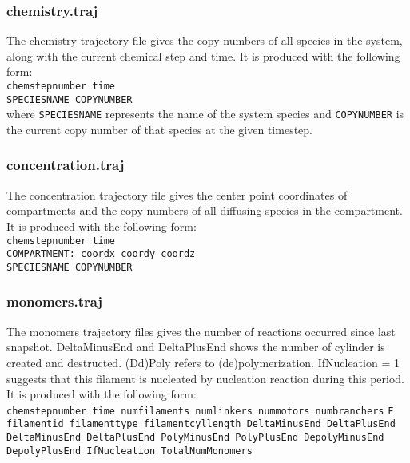 \documentclass[11pt, oneside]{article}   	%
\begin{document}
\subsubsection{chemistry.traj}
The chemistry trajectory file gives the copy numbers of all species in the system, along with the current chemical step and time. It is produced with the following form:\\

\noindent\texttt{chemstepnumber time}\\
\texttt{SPECIESNAME COPYNUMBER}\\

\noindent where \texttt{SPECIESNAME} represents the name of the system species and \texttt{COPYNUMBER} is the current copy number of that species at the given timestep.

\subsubsection{concentration.traj}
The concentration trajectory file gives the center point coordinates of compartments and the copy numbers of all diffusing species in the compartment. It is produced with the following form:\\

\noindent\texttt{chemstepnumber time}\\
\texttt{COMPARTMENT: coordx coordy coordz}\\
\texttt{SPECIESNAME COPYNUMBER}\\

\subsubsection{monomers.traj}
The monomers trajectory files gives the number of reactions occurred since last snapshot. DeltaMinusEnd and DeltaPlusEnd shows the number of cylinder is created and destructed. (Dd)Poly refers to (de)polymerization. IfNucleation = 1 suggests that this filament is nucleated by nucleation reaction during this period. It is produced with the following form:\\
\noindent\texttt{chemstepnumber time numfilaments numlinkers nummotors numbranchers}\newline
\texttt{F filamentid filamenttype filamentcyllength DeltaMinusEnd DeltaPlusEnd}\newline
\texttt{DeltaMinusEnd DeltaPlusEnd PolyMinusEnd PolyPlusEnd DepolyMinusEnd DepolyPlusEnd IfNucleation TotalNumMonomers}\newline
\end{document}
